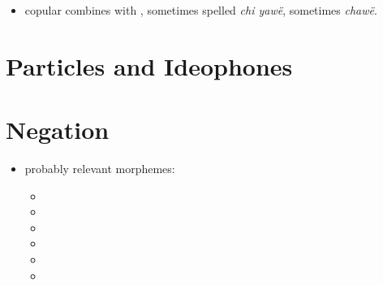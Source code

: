 \documentclass{memoir}
\begin{document}
\begin{itemize}
\tightlist
\item
  copular  combines with , sometimes spelled
  \emph{chi yawë}, sometimes \emph{chawë}.
\end{itemize}

\chapter{\texorpdfstring{Particles and Ideophones
\label{partideo}}{Particles and Ideophones }}

\chapter{\texorpdfstring{Negation \label{negation}}{Negation }}

\begin{itemize}
\tightlist
\item
  probably relevant morphemes:

  \begin{itemize}
  \item
  \item
  \item
  \item
  \item
  \item
  \end{itemize}
\end{itemize}

\printbibliography
\end{document}
